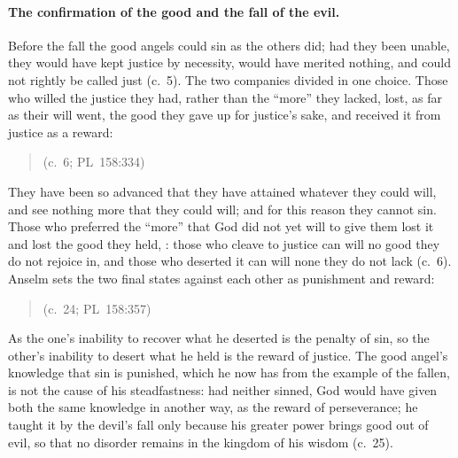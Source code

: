 \paragraph{The confirmation of the good and the fall of the evil.} Before
the fall the good angels could sin as the others did; had they been unable,
they would have kept justice by necessity, would have merited nothing, and
could not rightly be called just (c.~5). The two companies divided in one
choice. Those who willed the justice they had, rather than the ``more''
they lacked, lost, as far as their will went, the good they gave up for
justice's sake, and received it from justice as a reward:

\begin{quote}
 (c.~6; PL~158:334)
\end{quote}

\noindent They have been so advanced that they have attained whatever they
could will, and see nothing more that they could will; and for this reason
they cannot sin. Those who preferred the ``more'' that God did not yet will
to give them lost it and lost the good they held, : those who cleave to justice can will
no good they do not rejoice in, and those who deserted it can will none they
do not lack (c.~6). Anselm sets the two final states against each other as
punishment and reward:

\begin{quote}
 (c.~24; PL~158:357)
\end{quote}

\noindent As the one's inability to recover what he deserted is the penalty
of sin, so the other's inability to desert what he held is the reward of
justice. The good angel's knowledge that sin is punished, which he now has
from the example of the fallen, is not the cause of his steadfastness: had
neither sinned, God would have given both the same knowledge in another way,
as the reward of perseverance; he taught it by the devil's fall only because
his greater power brings good out of evil, so that no disorder remains in
the kingdom of his wisdom (c.~25).

